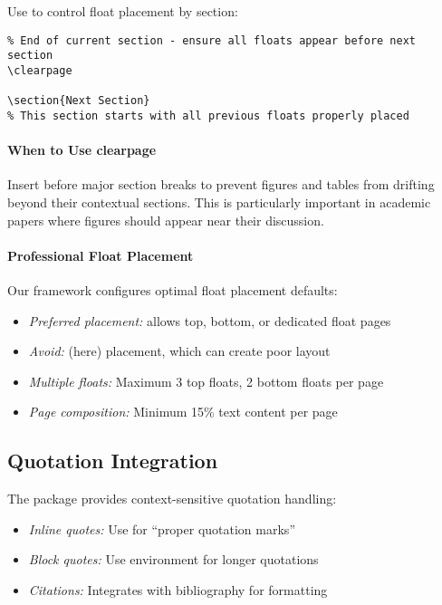 \documentclass[11pt]{article}
\begin{document}
Use  to control float placement by section:

\begin{verbatim}
% End of current section - ensure all floats appear before next section
\clearpage

\section{Next Section}
% This section starts with all previous floats properly placed
\end{verbatim}

\paragraph{When to Use clearpage} Insert  before major section breaks to prevent figures and tables from drifting beyond their contextual sections. This is particularly important in academic papers where figures should appear near their discussion.

\paragraph{Professional Float Placement} Our framework configures optimal float placement defaults:
\begin{itemize}
\item \emph{Preferred placement:} \code{[tbp]} allows top, bottom, or dedicated float pages
\item \emph{Avoid:} \code{[h]} (here) placement, which can create poor layout
\item \emph{Multiple floats:} Maximum 3 top floats, 2 bottom floats per page
\item \emph{Page composition:} Minimum 15\% text content per page
\end{itemize}

\subsection{Quotation Integration}

The  package provides context-sensitive quotation handling:

\begin{itemize}
\item \emph{Inline quotes:} Use  for \enquote{proper quotation marks}
\item \emph{Block quotes:} Use  environment for longer quotations
\item \emph{Citations:} Integrates with bibliography for  formatting
\end{itemize}
\end{document}
